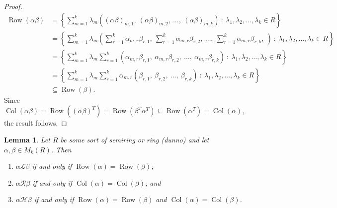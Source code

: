\documentclass{article}
\renewcommand{\L}{\mathscr{L}}
\renewcommand{\H}{\mathscr{H}}
\newcommand{\R}{\mathscr{R}}
\newcommand{\rowsp}{\operatorname{Row}}
\newcommand{\colsp}{\operatorname{Col}}
\newtheorem{lem}[thm]{Lemma}
\theoremstyle{definition}
\begin{document}
\begin{proof}
  \begin{align*}
    \rowsp(\alpha \beta)
      & = \left\{ \displaystyle\sum_{m = 1}^{k} \lambda_{m}
            \left( {(\alpha\beta)}_{m, 1},\ 
                   {(\alpha\beta)}_{m, 2},\ 
                   \ldots,\ 
                   {(\alpha\beta)}_{m, k}
            \right)\ :\
            \lambda_{1}, \lambda_{2}, \ldots, \lambda_{k} \in R \right\} \\
      & = \left\{ \displaystyle\sum_{m = 1}^{k} \lambda_{m}
             \left( \displaystyle\sum_{r = 1}^{k} \alpha_{m, r} \beta_{r, 1},\ 
                    \displaystyle\sum_{r = 1}^{k} \alpha_{m, r} \beta_{r, 2},\
                   \ldots,\ 
                    \displaystyle\sum_{r = 1}^{k} \alpha_{m, r} \beta_{r, k},\ 
             \right)\ :\
             \lambda_{1}, \lambda_{2}, \ldots, \lambda_{k} \in R \right\} \\
      & = \left\{ \displaystyle\sum_{m = 1}^{k} \lambda_{m}
            \displaystyle\sum_{r = 1}^{k}
            \left( \alpha_{m, r} \beta_{r, 1},\ 
                   \alpha_{m, r} \beta_{r, 2},\
                   \ldots,\ 
                   \alpha_{m, r} \beta_{r, k}
            \right)\ :\
            \lambda_{1}, \lambda_{2}, \ldots, \lambda_{k} \in R \right\} \\
      & = \left\{ \displaystyle\sum_{m = 1}^{k} \lambda_{m}
            \displaystyle\sum_{r = 1}^{k} \alpha_{m, r}
            \left( \beta_{r, 1},\ 
                   \beta_{r, 2},\
                   \ldots,\ 
                   \beta_{r, k}
            \right)\ :\
            \lambda_{1}, \lambda_{2}, \ldots, \lambda_{k} \in R \right\} \\
      & \subseteq \rowsp(\beta).
  \end{align*}
  Since $\colsp(\alpha\beta) = \rowsp\left({(\alpha\beta)}^{T}\right) =
  \rowsp\left(\beta^{T}\alpha^{T}\right) \subseteq \rowsp\left(\alpha^{T}\right)
  = \colsp(\alpha)$, the result follows.
\end{proof}

\begin{lem}\label{lem-l-r}
  Let $R$ be some sort of semiring or ring (dunno) and let
  $\alpha, \beta \in M_{k}(R)$. Then
  \begin{enumerate}
    \item
      $\alpha \L \beta$ if and only if $\rowsp(\alpha) = \rowsp(\beta)$;
    \item
      $\alpha \R \beta$ if and only if $\colsp(\alpha) = \colsp(\beta)$; and
    \item
      $\alpha \H \beta$ if and only if $\rowsp(\alpha) = \rowsp(\beta)$ and
      $\colsp(\alpha) = \colsp(\beta)$.
  \end{enumerate}
\end{lem}
\end{document}
